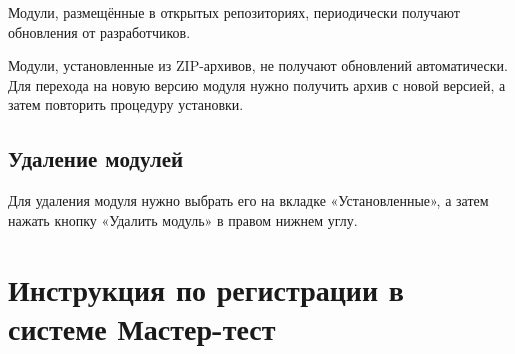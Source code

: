 \documentclass[
  12pt,
]{book}
\begin{document}
Модули, размещённые в открытых репозиториях, периодически получают обновления от разработчиков.

Модули, установленные из ZIP-архивов, не получают обновлений автоматически. Для перехода на новую версию модуля нужно получить архив с новой версией, а затем повторить процедуру установки.

\hypertarget{manual-plugins-uninstall}{%
\section{Удаление модулей}\label{manual-plugins-uninstall}}

Для удаления модуля нужно выбрать его на вкладке «Установленные», а затем нажать кнопку «Удалить модуль» в правом нижнем углу.

\hypertarget{mastertest}{%
\chapter{Инструкция по регистрации в системе Мастер-тест}\label{mastertest}}
\end{document}
